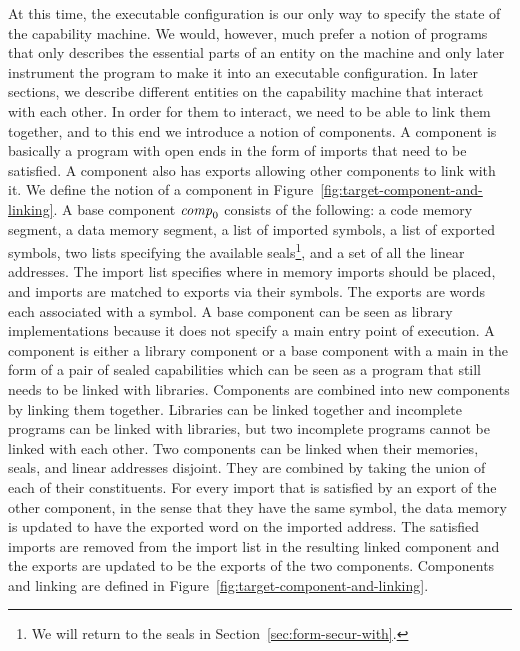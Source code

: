 \documentclass[acmsmall,review,anonymous]{acmart}\settopmatter{printfolios=true,printccs=false,printacmref=false}
\renewcommand{\comp}{\var{comp}}
\begin{document}
At this time, the executable configuration is our only way to specify the state of the capability machine.
We would, however, much prefer a notion of programs that only describes the essential parts of an entity on the machine and only later instrument the program to make it into an executable configuration.
In later sections, we describe different entities on the capability machine that interact with each other.
In order for them to interact, we need to be able to link them together, and to this end we introduce a notion of components.
A component is basically a program with open ends in the form of imports that need to be satisfied.
A component also has exports allowing other components to link with it.
We define the notion of a component in Figure~\ref{fig:target-component-and-linking}.
A base component $\comp_0$ consists of the following: a code memory segment, a data memory segment, a list of imported symbols, a list of exported symbols, two lists specifying the available seals\footnote{We will return to the seals in Section~\ref{sec:form-secur-with}.}, and a set of all the linear addresses.
The import list specifies where in memory imports should be placed, and imports are matched to exports via their symbols.
The exports are words each associated with a symbol.
A base component can be seen as library implementations because it does not specify a main entry point of execution.
A component is either a library component or a base component with a main in the form of a pair of sealed capabilities which can be seen as a program that still needs to be linked with libraries.
Components are combined into new components by linking them together.
Libraries can be linked together and incomplete programs can be linked with libraries, but two incomplete programs cannot be linked with each other.
Two components can be linked when their memories, seals, and linear addresses disjoint.
They are combined by taking the union of each of their constituents.
For every import that is satisfied by an export of the other component, in the sense that they have the same symbol, the data memory is updated to have the exported word on the imported address.
The satisfied imports are removed from the import list in the resulting linked component and the exports are updated to be the exports of the two components.
Components and linking are defined in Figure~\ref{fig:target-component-and-linking}.
\end{document}
